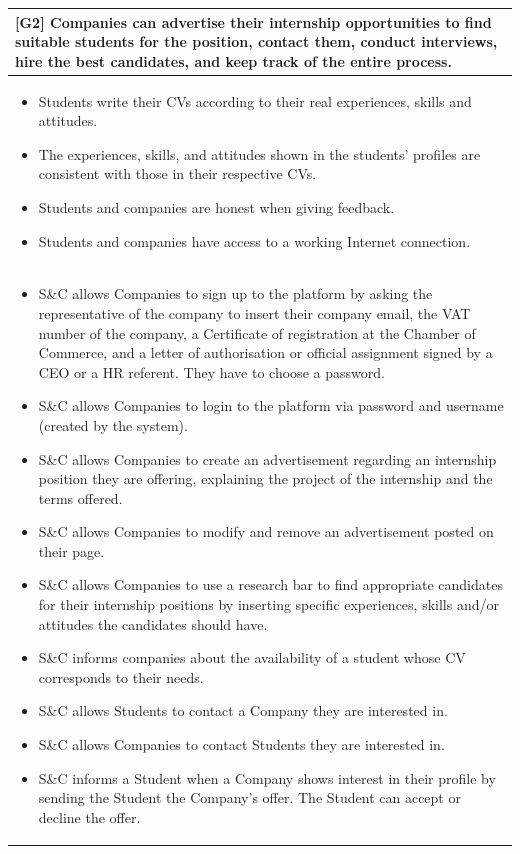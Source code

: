 \begin{table}[H]
    \centering
    \begin{tabular}{|p{15cm}|}
    \hline
    {\textbf{[G2]} Companies can advertise their internship opportunities to find suitable students for the position, contact them, conduct interviews, hire the best candidates, and keep track of the entire process.} 
    \\\hline \begin{itemize}
        \item[\text{[D3]}] Students write their CVs according to their real experiences, skills and attitudes.
        \item[\text{[D4]}] The experiences, skills, and attitudes shown in the students' profiles are consistent with those in their respective CVs. 
        \item[\text{[D6]}] Students and companies are honest when giving feedback.
        \item[\text{[D7]}] Students and companies have access to a working Internet connection.
    \end{itemize}\\ \hline
    \begin{itemize}
         \item[\text{[R3]}] S\&C allows Companies to sign up to the platform by asking the representative of the company to insert their company email, the VAT number of the company, a Certificate of registration at the Chamber of Commerce, and a letter of authorisation or official assignment signed by a CEO or a HR referent. They have to choose a password.
        \item[\text{[R4]}] S\&C allows Companies to login to the platform via password and username (created by the system).
        \item[\text{[R8]}] S\&C allows Companies to create an advertisement regarding an internship position they are offering, explaining the project of the internship and the terms offered.
    
        \item[\text{[R9]}] S\&C allows Companies to modify and remove an advertisement posted on their page.
        \item[\text{[R11]}] S\&C allows Companies to use a research bar to find appropriate candidates for their internship positions by inserting specific experiences, skills and/or attitudes the candidates should have.
        \item [\text{[R13]}] S\&C informs companies about the availability of a student whose CV corresponds to their needs.
        \item [\text{[R14]}] S\&C allows Students to contact a Company they are interested in.
        \item [\text{[R15]}] S\&C allows Companies to contact Students they are interested in.
        \item [\text{[R16]}] S\&C informs a Student when a Company shows interest in their profile by sending the Student the Company's offer. The Student can accept or decline the offer.
    

\end{itemize}
\end{tabular}
\end{table}
